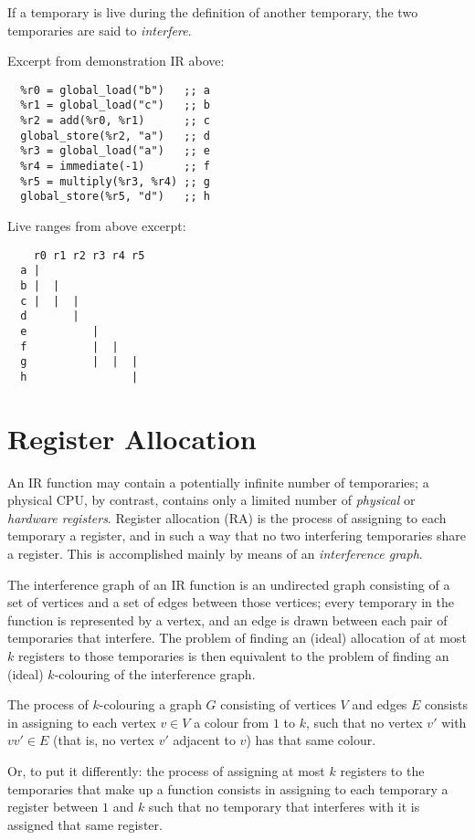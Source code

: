 \documentclass[12pt]{report}
\begin{document}
If a temporary is live during the definition of another temporary, the two temporaries are said to \emph{interfere}.

Excerpt from demonstration IR above:
\begin{Verbatim}
  %r0 = global_load("b")   ;; a
  %r1 = global_load("c")   ;; b
  %r2 = add(%r0, %r1)      ;; c
  global_store(%r2, "a")   ;; d
  %r3 = global_load("a")   ;; e
  %r4 = immediate(-1)      ;; f
  %r5 = multiply(%r3, %r4) ;; g
  global_store(%r5, "d")   ;; h
\end{Verbatim}

Live ranges from above excerpt:
\begin{Verbatim}
    r0 r1 r2 r3 r4 r5
  a |
  b |  |
  c |  |  |
  d       |
  e          |
  f          |  |
  g          |  |  |
  h                |
\end{Verbatim}

\chapter{Register Allocation}
\label{sec:codegen-register-allocation}
An IR function may contain a potentially infinite number of temporaries; a physical CPU, by contrast, contains only a limited number
of \textit{physical} or \textit{hardware registers}. Register allocation (RA) is the process of assigning to each temporary a register, and
in such a way that no two interfering temporaries share a register. This is accomplished mainly by means of an \textit{interference graph}.

The interference graph of an IR function is an undirected graph consisting of a set of vertices and a set of edges between those
vertices; every temporary in the function is represented by a vertex, and an edge is drawn between each pair of temporaries that
interfere. The problem of finding an (ideal) allocation of at most $k$ registers to those temporaries is then equivalent to the problem
of finding an (ideal) $k$-colouring of the interference graph.

The process of $k$-colouring a graph $G$ consisting of vertices $V$ and edges $E$ consists in assigning to each vertex $v \in V$ a colour
from $1$ to $k$, such that no vertex $v'$ with $vv' \in E$ (that is, no vertex $v'$ adjacent to $v$) has that same colour.

Or, to put it differently: the process of assigning at most $k$ registers to the temporaries that make up  a function consists in assigning
 to each temporary a register between $1$ and $k$ such that no temporary that interferes with it is assigned that same register.
\end{document}
